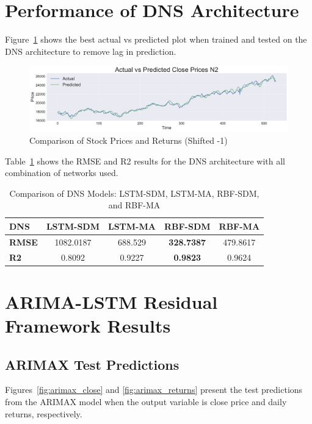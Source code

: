 \section{Performance of DNS Architecture}

Figure~\ref{fig:DNSplot} shows the best actual vs predicted plot when trained and tested on the DNS architecture to remove lag in prediction.

\begin{figure}[h!]
    \centering
    \includegraphics[width=\textwidth]{Images/actual_vs_predicted_main_N2_50seq_LSTM.pdf}
    \caption{ Comparison of Stock Prices and Returns (Shifted -1)}
    \label{fig:DNSplot}
\end{figure}

Table~\ref{tab:DNSres} shows the RMSE and R2 results for the DNS architecture with all combination of networks used.

\begin{table}[ht]
\centering
\caption{Comparison of DNS Models: LSTM-SDM, LSTM-MA, RBF-SDM, and RBF-MA}
\begin{tabular}{|l|c|c|c|c|}
\hline
\textbf{DNS}     & \textbf{LSTM-SDM} & \textbf{LSTM-MA} & \textbf{RBF-SDM} & \textbf{RBF-MA} \\ \hline
\textbf{RMSE}    & 1082.0187          & 688.529          & \textbf{328.7387}         & 479.8617        \\ \hline
\textbf{R2}      & 0.8092             & 0.9227           & \textbf{0.9823}  & 0.9624          \\ \hline
\end{tabular}

\label{tab:DNSres}
\end{table}

\section{ARIMA-LSTM Residual Framework Results}

\subsection{ARIMAX Test Predictions}
Figures~\ref{fig:arimax_close} and \ref{fig:arimax_returns} present the test predictions from the ARIMAX model when the output variable is close price and daily returns, respectively.

